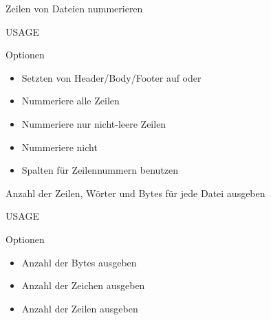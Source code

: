 \documentclass[aspectratio=43]{beamer}
\begin{document}
\begin{frame} 
	\begin{block}{} 
        Zeilen von Dateien nummerieren
	\end{block}
	\begin{block}{USAGE} 
	\end{block}
	\begin{exampleblock}{Optionen} 
	\begin{itemize}
	\item {} \newline Setzten von Header/Body/Footer auf  oder 
	\item {} Nummeriere alle Zeilen
	\item {} Nummeriere nur nicht-leere Zeilen
	\item {} Nummeriere nicht
	\item {} Spalten für Zeilennummern benutzen
	
	\end{itemize}
	
	\end{exampleblock}
\end{frame}

\begin{frame} 
	\begin{block}{} 
         Anzahl der Zeilen, Wörter und Bytes für jede Datei ausgeben
	\end{block}
	\begin{block}{USAGE} 
	\end{block}
	\begin{exampleblock}{Optionen} 
	\begin{itemize}
	\item {}  Anzahl der Bytes ausgeben
	\item {} Anzahl der Zeichen ausgeben
	\item {} Anzahl der Zeilen ausgeben
	
	\end{itemize}
	
	\end{exampleblock}
\end{frame}
\end{document}
